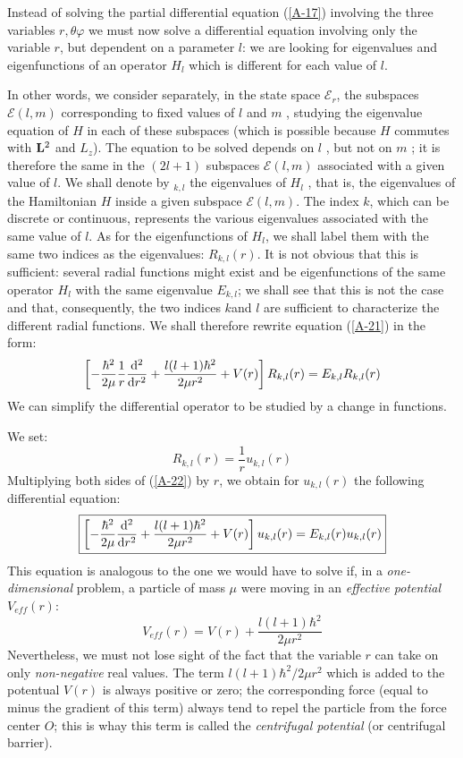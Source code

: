 Instead of solving the partial differential equation (\ref{A-17}) involving the three variables $r,\theta\varphi$ we must now solve a differential equation involving only the variable $r$, but dependent on a parameter $l$: we are looking for eigenvalues and eigenfunctions of an operator $H_l$ which is different for each value of $l$.

In other words, we consider separately, in the state space $\mathcal{E}_r$, the subspaces $\mathcal{E}(l,m)$ corresponding to fixed values of $l$ and $m$ , studying the eigenvalue equation of $H$ in each of these subspaces (which is possible because $H$ commutes with $\vb{L}^2$ and $L_z$). The equation to be solved depends on $l$ , but not on $m$ ; it is therefore the same in the $(2l+1)$ subspaces $\mathcal{E}(l,m)$ associated with a given value of $l$. We shall denote by $_{k,l}$ the eigenvalues of $H_l$ , that is, the eigenvalues of the Hamiltonian $H$ inside a given subspace $\mathcal{E}(l,m)$. The index $k$, which can be discrete or continuous, represents the various eigenvalues associated with the same value of $l$. As for the eigenfunctions of $H_l$, we shall label them with the same two indices as the eigenvalues: $R_{k,l}(r)$. It is not obvious that this is sufficient: several radial functions might exist and be eigenfunctions of the same operator $H_l$ with the same eigenvalue $E_{k,l}$; we shall see that this is not the case and that, consequently, the two indices $k $and $l$ are sufficient to characterize the different radial functions. We shall therefore rewrite equation (\ref{A-21}) in the form:
\begin{equation}\label{A-22}
	\left[-\frac{\hbar^2}{2\mu}\frac{1}{r}\dv[2]{r}+\frac{l(l+1)\hbar^2}{2\mu r^2}+V(r)\right]R_{k,l}(r)=E_{k,l}R_{k,l}(r)
\end{equation}
We can simplify the differential operator to be studied by a change in functions.

We set:
\begin{equation}\label{A-23}
	R_{k,l}(r)=\frac{1}{r}u_{k,l}(r)
\end{equation}
Multiplying both sides of (\ref{A-22}) by $r$, we obtain for $u_{k,l}(r)$ the following differential equation:
\begin{equation}\label{A-24}
	\boxed{\left[-\frac{\hbar^2}{2\mu}\dv[2]{r}+\frac{l(l+1)\hbar^2}{2\mu r^2}+V(r)\right]u_{k,l}(r)=E_{k,l}(r)u_{k,l}(r)}
\end{equation}
This equation is analogous to the one we would have to solve if, in a \textit{one-dimensional} problem, a particle of mass $\mu$ were moving in an \textit{effective potential} $V_{eff}(r)$: 
\begin{equation}\label{A-25}
	V_{eff}(r)=V(r)+\frac{l(l+1)\hbar^2}{2\mu r^2}
\end{equation}
Nevertheless, we must not lose sight of the fact that the variable $r$ can take on only \textit{non-negative} real values. The term $l(l+1)\hbar^2/2\mu r^2$ which is added to the potentual $V(r)$ is always positive or zero; the corresponding force (equal to minus the gradient of this term) always tend to repel the particle from the force center $O$; this is whay this term is called the \textit{centrifugal potential} (or centrifugal barrier).

